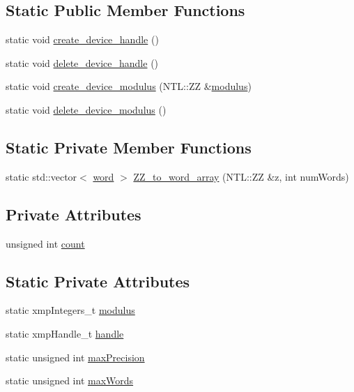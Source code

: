 \subsection*{Static Public Member Functions}
\begin{DoxyCompactItemize}
\item 
static void \hyperlink{classHE1Array_ab07c3a11d23c4115ef3495482fb65fb0}{create\+\_\+device\+\_\+handle} ()
\item 
static void \hyperlink{classHE1Array_a38ce380d3cdb0dd9e59c0515af87493c}{delete\+\_\+device\+\_\+handle} ()
\item 
static void \hyperlink{classHE1Array_aa57bea5fd5ce8288a868cacc9ec69c90}{create\+\_\+device\+\_\+modulus} (N\+T\+L\+::\+ZZ \&\hyperlink{classHE1Array_a164afa9080888fad5d805a98021d9c57}{modulus})
\item 
static void \hyperlink{classHE1Array_a11536c5066ce8bddb7e8ddf3e9de6146}{delete\+\_\+device\+\_\+modulus} ()
\end{DoxyCompactItemize}
\subsection*{Static Private Member Functions}
\begin{DoxyCompactItemize}
\item 
static std\+::vector$<$ \hyperlink{HE1Array_8h_a19036394f9c80a08fc846c96f668711c}{word} $>$ \hyperlink{classHE1Array_a60718a561d39e7036c32abcf92c5c9c1}{Z\+Z\+\_\+to\+\_\+word\+\_\+array} (N\+T\+L\+::\+ZZ \&z, int num\+Words)
\end{DoxyCompactItemize}
\subsection*{Private Attributes}
\begin{DoxyCompactItemize}
\item 
unsigned int \hyperlink{classHE1Array_a486ac51b636d5434c6d456a0b470ab1e}{count}
\end{DoxyCompactItemize}
\subsection*{Static Private Attributes}
\begin{DoxyCompactItemize}
\item 
static xmp\+Integers\+\_\+t \hyperlink{classHE1Array_a164afa9080888fad5d805a98021d9c57}{modulus}
\item 
static xmp\+Handle\+\_\+t \hyperlink{classHE1Array_a6f4fd4ae4280b6ac4abe146f80a0ade4}{handle}
\item 
static unsigned int \hyperlink{classHE1Array_a552ef796b7fa4c00e142acdc78852a89}{max\+Precision}
\item 
static unsigned int \hyperlink{classHE1Array_acfcbb207535ce6e489b986e36080c784}{max\+Words}
\end{DoxyCompactItemize}
